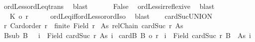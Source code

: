 \begin{isabellebody}
\ ordLess{\isacharunderscore}{\kern0pt}ordLeq{\isacharunderscore}{\kern0pt}trans\ \isamarkupfalse%
\ blast\isanewline
\ \ \ \ \ \isamarkupfalse%
\ False\ \isamarkupfalse%
\ ordLess{\isacharunderscore}{\kern0pt}irreflexive\ \isamarkupfalse%
\ blast\isanewline
\ \ \ \ \isacommand{{\isacharbraceright}{\kern0pt}}\isamarkupfalse%
\isanewline
\ \ \ \ \isamarkupfalse%
\ \isamarkupfalse%
\ {\isachardoublequoteopen}{\isacharbar}{\kern0pt}K{\isacharbar}{\kern0pt}\ {\isacharequal}{\kern0pt}o\ {\isacharquery}{\kern0pt}r{\isacharprime}{\kern0pt}{\isachardoublequoteclose}\isanewline
\ \ \ \ \isamarkupfalse%
\ ordLeq{\isacharunderscore}{\kern0pt}iff{\isacharunderscore}{\kern0pt}ordLess{\isacharunderscore}{\kern0pt}or{\isacharunderscore}{\kern0pt}ordIso\ \isamarkupfalse%
\ blast\isanewline
\ \ \isamarkupfalse%
\isanewline
{}\isamarkupfalse%
%
\endisatagproof
{\isafoldproof}%
%
\isadelimproof
\isanewline
%
\endisadelimproof
\isanewline
{}\isamarkupfalse%
\ cardSuc{\isacharunderscore}{\kern0pt}UNION{\isacharcolon}{\kern0pt}\isanewline
{}\ r{\isacharcolon}{\kern0pt}\ {\isachardoublequoteopen}Card{\isacharunderscore}{\kern0pt}order\ r{\isachardoublequoteclose}\ \ {\isachardoublequoteopen}{\isasymnot}finite\ {\isacharparenleft}{\kern0pt}Field\ r{\isacharparenright}{\kern0pt}{\isachardoublequoteclose}\isanewline
{}\ As{\isacharcolon}{\kern0pt}\ {\isachardoublequoteopen}relChain\ {\isacharparenleft}{\kern0pt}cardSuc\ r{\isacharparenright}{\kern0pt}\ As{\isachardoublequoteclose}\isanewline
{}\ Bsub{\isacharcolon}{\kern0pt}\ {\isachardoublequoteopen}B\ {\isasymle}\ {\isacharparenleft}{\kern0pt}{\isasymUnion}\ i\ {\isasymin}\ Field\ {\isacharparenleft}{\kern0pt}cardSuc\ r{\isacharparenright}{\kern0pt}{\isachardot}{\kern0pt}\ As\ i{\isacharparenright}{\kern0pt}{\isachardoublequoteclose}\isanewline
{}\ cardB{\isacharcolon}{\kern0pt}\ {\isachardoublequoteopen}{\isacharbar}{\kern0pt}B{\isacharbar}{\kern0pt}\ {\isacharless}{\kern0pt}{\isacharequal}{\kern0pt}o\ r{\isachardoublequoteclose}\isanewline
{}\ {\isachardoublequoteopen}{\isasymexists}i\ {\isasymin}\ Field\ {\isacharparenleft}{\kern0pt}cardSuc\ r{\isacharparenright}{\kern0pt}{\isachardot}{\kern0pt}\ B\ {\isasymle}\ As\ i{\isachardoublequoteclose}\isanewline
%
\isadelimproof
%
\endisadelimproof
%
\isatagproof
{}\isamarkupfalse%
{\isacharminus}{\kern0pt}\isanewline

\end{isabellebody}
